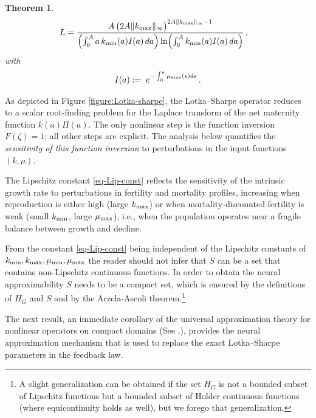 \documentclass[journal,twoside,web]{ieeecolor}
\newtheorem{theorem}{Theorem}
\begin{document}
\begin{theorem}
\begin{align}
\label{eq-Lip-const}
L =\;&
\frac{
A\,\bigl(2A\|k_{\rm max}\|_\infty\bigr)^{2A\|k_{\rm max}\|_\infty-1}
}{
\left(\int_0^A a\,k_{\rm min}(a)I(a)\,da\right)
\ln\!\left(\int_0^A k_{\rm min}(a)I(a)\,da\right)
}\,, 
\end{align}
with
\begin{align}
    I(a) :=\; e^{-\int_0^a \mu_{\rm max}(s) ds }\,. 
\end{align}
\end{theorem}

As depicted in Figure \ref{figure:Lotka-sharpe}, the Lotka–Sharpe operator reduces to a scalar root-finding problem for the Laplace transform of the net maternity function $k(a)\Pi(a)$. The only nonlinear step is the function inversion $F(\zeta)=1$; all other steps are explicit. The analysis below quantifies the {\em sensitivity of this function inversion} to perturbations in the input functions $(k,\mu)$.

The Lipschitz constant \eqref{eq-Lip-const} reflects the sensitivity of the intrinsic growth rate to perturbations in fertility and mortality profiles, increasing when reproduction is either high (large $k_{\rm max}$) or when mortality-discounted fertility is weak (small $k_{\rm min}$, large $\mu_{\rm max}$), i.e., when the population operates near a fragile balance between growth and decline. 

From the constant \eqref{eq-Lip-const} being independent of the Lipschitz constants of $k_{\rm min}, k_{\rm max}, \mu_{\rm min}, \mu_{\rm max}$ the reader should not infer that $S$ can be a set that contains non-Lipschitz continuous functions. In order to obtain the
neural approximability $S$ needs to be a compact set, which is ensured by the definitions of $H_G$ and $S$ and by the Arzela-Ascoli theorem.\footnote{A slight
generalization can be obtained if the set $H_G$ is not a bounded subset of Lipschitz functions but a bounded subset of Holder continuous functions (where equicontinuity holds as well), but we forego that generalization.}

The next result, an immediate corollary of the universal approximation theory for nonlinear operators on compact domains (See \cite{chen1995Universal},\cite[Theorem 1]{Lanthaler2025Nonlocality}), provides the neural approximation mechanism that is used to replace the exact Lotka–Sharpe parameters in the feedback law. 
\end{document}
